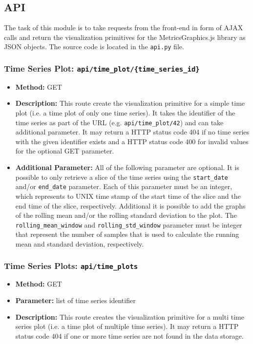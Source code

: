 \documentclass[11pt, a4paper]{article}
\begin{document}
\subsection{API}
The task of this module is to take requests from the front-end in form of AJAX calls and return the visualization primitives for the MetricsGraphics.js library as JSON objects.
The source code is located in the \texttt{api.py} file.

\subsubsection*{Time Series Plot: \texttt{api/time\_plot/\{time\_series\_id\}}}
\begin{itemize}
 \item[] \textbf{Method:} GET 
 \item[] \textbf{Description:} This route create the visualization primitive for a simple time plot (i.e. a time plot of only one time series).
 It takes the identifier of the time series as part of the URL (e.g. \texttt{api/time\_plot/42}) and can take additional parameter.
 It may return a HTTP status code 404 if no time series with the given identifier exists and a HTTP status code 400 for invalid values for the optional GET parameter.
 \item[] \textbf{Additional Parameter:} All of the following parameter are optional.
 It is possible to only retrieve a slice of the time series using the \texttt{start\_date} and/or \texttt{end\_date} parameter.
 Each of this parameter must be an integer, which represents to UNIX time stamp of the start time of the slice and the end time of the slice, respectively. 
 Additional it is possible to add the graphs of the rolling mean and/or the rolling standard deviation to the plot.
 The \texttt{rolling\_mean\_window} and \texttt{rolling\_std\_window} parameter must be integer that represent the number of samples that is used to calculate the running mean and standard deviation, respectively.
\end{itemize}


\subsubsection*{Time Series Plots: \texttt{api/time\_plots}}
\begin{itemize}
 \item[] \textbf{Method:} GET 
 \item[] \textbf{Parameter:} list of time series identifier
 \item[] \textbf{Description:} This route creates the visualization primitive for a multi time series plot (i.e. a time plot of multiple time series).
 It may return a HTTP status code 404 if one or more time series are not found in the data storage.
\end{itemize}
\end{document}
